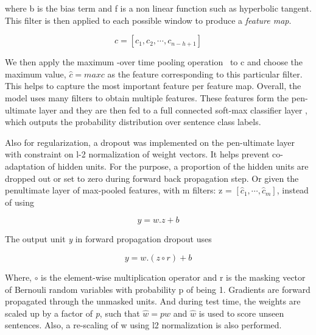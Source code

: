 where b is the bias term and f is a non linear function such as hyperbolic tangent. This filter is then applied to each possible window to produce a \textit{feature map}.

\begin{equation}
c = [{c}_{1}, {c}_{2}, \cdots , {c}_{n-h+1}]
\end{equation}

We then apply the maximum -over time pooling operation~\parencite{nlpscratch} to c and choose the maximum value, $\hat{c} = max{c}$ as the feature corresponding to this particular filter. This helps to capture the most important feature per feature map. Overall, the model uses many filters to obtain multiple features. These features form the pen-ultimate layer and they are then fed to a full connected soft-max classifier layer , which outputs the probability distribution over sentence class labels. 

Also for regularization, a dropout was implemented on the pen-ultimate layer with constraint on l-2 normalization of weight vectors. It helps prevent co-adaptation of hidden units. For the purpose, a proportion  of the hidden units are dropped out or set to zero during forward back propagation step. Or given the penultimate layer of max-pooled features, with m filters: z =   $[ \hat{{c}}_{1} , \cdots , \hat{{c}}_{m} ]$, instead of using

\begin{equation}
 y = w . z + b
\end{equation}

The output unit \textit{y} in forward propagation dropout uses

\begin{equation}
 y = w .( z \circ  r) + b
\end{equation}

Where, $\circ$ is the element-wise multiplication operator and r is the masking vector of Bernouli random variables with probability p of being 1. Gradients are forward propagated through the unmasked units. And during test time, the weights are scaled up by a factor of \textit{p}, such that $\hat{w} = pw$ and $\hat{w}$ is used to score unseen sentences. Also, a re-scaling of w using l2 normalization is also performed.

